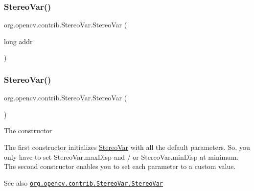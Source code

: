 \subsubsection{\texorpdfstring{Stereo\+Var()}{StereoVar()}\hspace{0.1cm}{\footnotesize\ttfamily [1/3]}}
{\footnotesize\ttfamily org.\+opencv.\+contrib.\+Stereo\+Var.\+Stereo\+Var (\begin{DoxyParamCaption}\item[{long}]{addr }\end{DoxyParamCaption})\hspace{0.3cm}{\ttfamily [protected]}}

\mbox{\label{classorg_1_1opencv_1_1contrib_1_1_stereo_var_a41e4ac2c35cc18a53955d6d3bb847009}} 
\subsubsection{\texorpdfstring{Stereo\+Var()}{StereoVar()}\hspace{0.1cm}{\footnotesize\ttfamily [2/3]}}
{\footnotesize\ttfamily org.\+opencv.\+contrib.\+Stereo\+Var.\+Stereo\+Var (\begin{DoxyParamCaption}{ }\end{DoxyParamCaption})}

The constructor

The first constructor initializes {\ttfamily \mbox{\hyperlink{classorg_1_1opencv_1_1contrib_1_1_stereo_var}{Stereo\+Var}}} with all the default parameters. So, you only have to set {\ttfamily Stereo\+Var.\+max\+Disp} and / or {\ttfamily Stereo\+Var.\+min\+Disp} at minimum. The second constructor enables you to set each parameter to a custom value.

\begin{DoxySeeAlso}{See also}
\href{http://docs.opencv.org/modules/contrib/doc/stereo.html#stereovar-stereovar}{\tt org.\+opencv.\+contrib.\+Stereo\+Var.\+Stereo\+Var} 
\end{DoxySeeAlso}
\mbox{\label{classorg_1_1opencv_1_1contrib_1_1_stereo_var_a879bf6a23f69e15102c6a4c2b6cf36cb}} 
